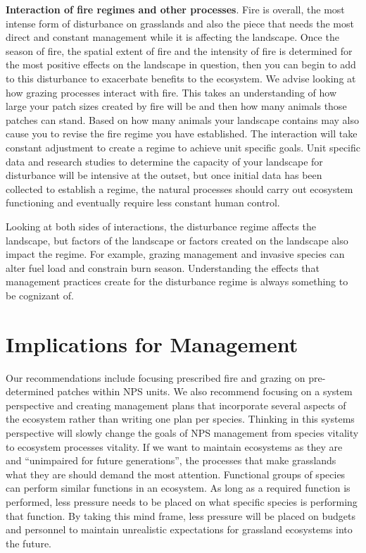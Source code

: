 \textbf{Interaction of fire regimes and other processes}. Fire is overall, the most intense form of disturbance on grasslands and also the piece that needs the most direct and constant management while it is affecting the landscape. 
Once the season of fire, the spatial extent of fire and the intensity of fire is determined for the most positive effects on the landscape in question, then you can begin to add to this disturbance to exacerbate benefits to the ecosystem. 
We advise looking at how grazing processes interact with fire. 
This takes an understanding of how large your patch sizes created by fire will be and then how many animals those patches can stand. 
Based on how many animals your landscape contains may also cause you to revise the fire regime you have established. 
The interaction will take constant adjustment to create a regime to achieve unit specific goals. 
Unit specific data and research studies to determine the capacity of your landscape for disturbance will be intensive at the outset, but once initial data has been collected to establish a regime, the natural processes should carry out ecosystem functioning and eventually require less constant human control.

Looking at both sides of interactions, the disturbance regime affects the landscape, but factors of the landscape or factors created on the landscape also impact the regime. 
For example, grazing management and invasive species can alter fuel load and constrain burn season.
Understanding the effects that management practices create for the disturbance regime is always something to be cognizant of.

\hypertarget{implications-for-management-1}{%
\section{Implications for Management} \label{implications-for-management-1}}

Our recommendations include focusing prescribed fire and grazing on pre-determined patches within NPS units.
 We also recommend focusing on a system perspective and creating management plans that incorporate several aspects of the ecosystem rather than writing one plan per species. 
Thinking in this systems perspective will slowly change the goals of NPS management from species vitality to ecosystem processes vitality. 
If we want to maintain ecosystems as they are and ``unimpaired for future generations'', the processes that make grasslands what they are should demand the most attention. 
Functional groups of species can perform similar functions in an ecosystem. 
As long as a required function is performed, less pressure needs to be placed on what specific species is performing that function. 
By taking this mind frame, less pressure will be placed on budgets and personnel to maintain unrealistic expectations for grassland ecosystems into the future.

